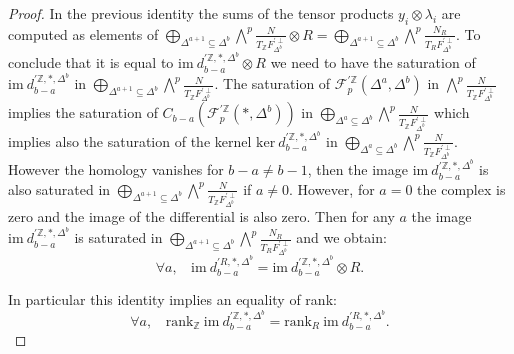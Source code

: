 \documentclass{article}
\begin{document}
\begin{proof}
    In the previous identity the sums of the tensor products $y_i \otimes\lambda_i$ are computed as elements of $\bigoplus_{\Delta^{a+1} \subseteq \Delta^b} \bigwedge^p\frac{N}{T_{\mathbb{Z}}F_{\Delta^b}^{'\perp}} \otimes R = \bigoplus_{\Delta^{a+1} \subseteq \Delta^b} \bigwedge^p\frac{N_R}{T_{R}F_{\Delta^b}^{'\perp}}$. To conclude that it is equal to $\mathrm{im}~d^{'\mathbb{Z},*,\Delta^b}_{b-a} \otimes R$ we need to have the saturation of $\mathrm{im}~d^{'\mathbb{Z},*,\Delta^b}_{b-a}$ in $\bigoplus_{\Delta^{a+1} \subseteq \Delta^b} \bigwedge^p\frac{N}{T_{\mathbb{Z}}F_{\Delta^b}^{'\perp}}$. The saturation of $\mathcal{F}_p^{'\mathbb{Z}}(\Delta^a,\Delta^b)$ in $\bigwedge^p\frac{N}{T_{\mathbb{Z}}F_{\Delta^b}^{'\perp}}$ implies the saturation of $C_{b-a}(\mathcal{F}^{'\mathbb{Z}}_p(*,\Delta^b))$ in $\bigoplus_{\Delta^a \subseteq \Delta^b} \bigwedge^p\frac{N}{T_{\mathbb{Z}}F_{\Delta^b}^{'\perp}}$ which implies also the saturation of the kernel $\mathrm{ker}~d^{'\mathbb{Z},*,\Delta^b}_{b-a}$ in $\bigoplus_{\Delta^a \subseteq \Delta^b} \bigwedge^p\frac{N}{T_{\mathbb{Z}}F_{\Delta^b}^{'\perp}}$. However the homology vanishes for $b-a\neq b-1$, then the image $\mathrm{im}~d^{'\mathbb{Z},*,\Delta^b}_{b-a}$ is also saturated in $\bigoplus_{\Delta^{a+1} \subseteq \Delta^b} \bigwedge^p\frac{N}{T_{\mathbb{Z}}F_{\Delta^b}^{'\perp}}$ if $a \neq 0$. However, for $a=0$ the complex is zero and the image of the differential is also zero. Then for any $a$ the image $\mathrm{im}~d^{'\mathbb{Z},*,\Delta^b}_{b-a}$ is saturated in $\bigoplus_{\Delta^{a+1} \subseteq \Delta^b} \bigwedge^p\frac{N_R}{T_{R}F_{\Delta^b}^{'\perp}}$ and we obtain:
    \begin{equation}
        \forall a,~~~~\mathrm{im}~d^{'R,*,\Delta^b}_{b-a}=\mathrm{im}~d^{'\mathbb{Z},*,\Delta^b}_{b-a} \otimes R.
        \label{tens2}
    \end{equation}

    In particular this identity implies an equality of rank:
    \begin{equation}
        \forall a,~~~~\mathrm{rank}_{\mathbb{Z}}~\mathrm{im}~d^{'\mathbb{Z},*,\Delta^b}_{b-a} = \mathrm{rank}_{R}~\mathrm{im}~d^{'R,*,\Delta^b}_{b-a}.
        \label{rktens2}
    \end{equation}


\end{proof}
\end{document}
